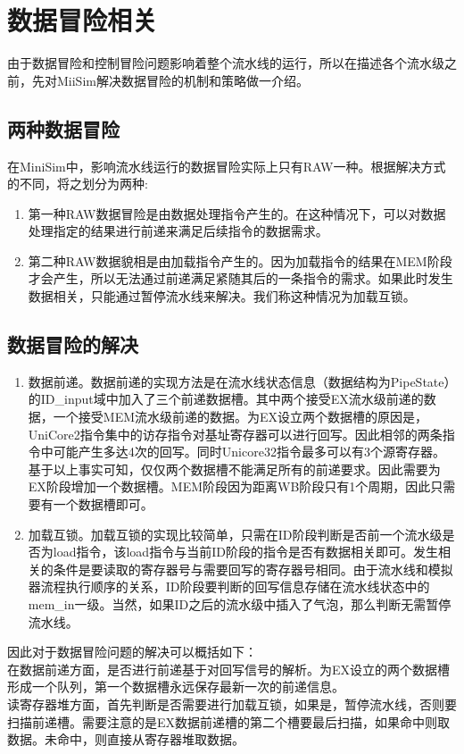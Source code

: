 \documentclass[12pt,a4paper,Flow]{report}
\begin{document}
\section{数据冒险相关}
由于数据冒险和控制冒险问题影响着整个流水线的运行，所以在描述各个流水级之前，先对MiiSim解决数据冒险的机制和策略做一介绍。
\subsection{两种数据冒险}
在MiniSim中，影响流水线运行的数据冒险实际上只有RAW一种。根据解决方式的不同，将之划分为两种:
\begin{enumerate}
\item 第一种RAW数据冒险是由数据处理指令产生的。在这种情况下，可以对数据处理指定的结果进行前递来满足后续指令的数据需求。
\item 第二种RAW数据貌相是由加载指令产生的。因为加载指令的结果在MEM阶段才会产生，所以无法通过前递满足紧随其后的一条指令的需求。如果此时发生数据相关，只能通过暂停流水线来解决。我们称这种情况为加载互锁。
\end{enumerate}
\subsection{数据冒险的解决}
\begin{enumerate}
\item 数据前递。数据前递的实现方法是在流水线状态信息（数据结构为PipeState）的ID\_input域中加入了三个前递数据槽。其中两个接受EX流水级前递的数据，一个接受MEM流水级前递的数据。为EX设立两个数据槽的原因是，UniCore2指令集中的访存指令对基址寄存器可以进行回写。因此相邻的两条指令中可能产生多达4次的回写。同时Unicore32指令最多可以有3个源寄存器。基于以上事实可知，仅仅两个数据槽不能满足所有的前递要求。因此需要为EX阶段增加一个数据槽。MEM阶段因为距离WB阶段只有1个周期，因此只需要有一个数据槽即可。
\item 加载互锁。加载互锁的实现比较简单，只需在ID阶段判断是否前一个流水级是否为load指令，该load指令与当前ID阶段的指令是否有数据相关即可。发生相关的条件是要读取的寄存器号与需要回写的寄存器号相同。由于流水线和模拟器流程执行顺序的关系，ID阶段要判断的回写信息存储在流水线状态中的mem\_in一级。当然，如果ID之后的流水级中插入了气泡，那么判断无需暂停流水线。
\end{enumerate}
\indent 因此对于数据冒险问题的解决可以概括如下：\\
\indent 在数据前递方面，是否进行前递基于对回写信号的解析。为EX设立的两个数据槽形成一个队列，第一个数据槽永远保存最新一次的前递信息。\\
\indent 读寄存器堆方面，首先判断是否需要进行加载互锁，如果是，暂停流水线，否则要扫描前递槽。需要注意的是EX数据前递槽的第二个槽要最后扫描，如果命中则取数据。未命中，则直接从寄存器堆取数据。
\end{document}
